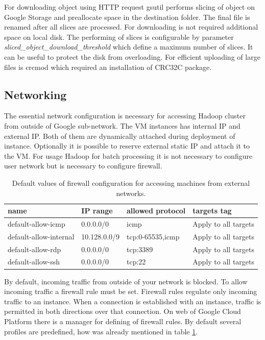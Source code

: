 \documentclass[a4paper,12pt,oneside]{report}
\begin{document}
	For downloading object using HTTP request gsutil performs slicing of object on
	Google Storage  and preallocate space in the destination folder. 
	The final file is renamed after all slices are	processed. For downloading 
	is not required additional space on local disk. The performing of slices is configurable by parameter
	\textit{sliced\_object\_download\_threshold} which 	define a maximum number of slices. It can be 
	useful to protect the disk from overloading. For efficient uploading of large
	files is crcmod which required 	an installation  of CRC32C package. 
	
	\subsection{Networking}
	The essential network configuration is necessary  for accessing Hadoop cluster
	from outside of Google sub-network. The VM instances has internal IP and
	external IP. Both of them are dynamically attached during deployment of
	instance. Optionally it is possible to reserve external static IP and attach it to
	the VM.  For usage Hadoop for batch processing it is not necessary to configure
	user network but is necessary to configure firewall. 
	
	\begin{table}[!htbp]
		\centering
		\begin{scriptsize}
			\begin{tabular}{@{}|l|l|l|l|@{}}
				\toprule
				name                   & IP range     & allowed protocol & targets tag         
				\\ \midrule  \midrule
				default-allow-icmp     & 0.0.0.0/0    & icmp             & Apply to all targets
				\\ \midrule
				default-allow-internal & 10.128.0.0/9 & tcp:0-65535,icmp & Apply to all targets
				\\ \midrule
				default-allow-rdp      & 0.0.0.0/0    & tcp:3389         & Apply to all targets
				\\ \midrule
				default-allow-ssh      & 0.0.0.0/0    & tcp:22           & Apply to all targets
				\\ \bottomrule
			\end{tabular}
		\end{scriptsize}
		\caption{Default values of firewall configuration for accessing machines from external networks.}
		\label{firewall}
	\end{table}
	By default, incoming traffic from outside of your network is blocked. To allow
	incoming traffic a firewall rule must be set. Firewall rules regulate only incoming
	traffic to an instance. When a connection is established with an instance,
	traffic is permitted in both directions over that connection. On web of Google
	Cloud Platform there is a manager for defining of firewall rules. By default several
	profiles are predefined, how was already mentioned in table \ref{firewall}.
	
\end{document}
